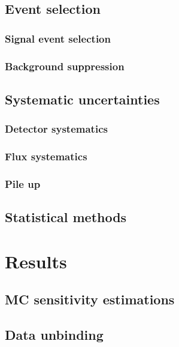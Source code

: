 \documentclass[../main.tex]{subfiles}
\begin{document}
\section{Event selection}
\label{HNL:sel}
\subsection{Signal event selection}
\subsection{Background suppression}
\label{HNL:bg}
\section{Systematic uncertainties}
\subsection{Detector systematics}
\subsection{Flux systematics}
\subsection{Pile up}
\section{Statistical methods}
\chapter{Results}
\section{MC sensitivity estimations}
\section{Data unbinding}
\end{document}
